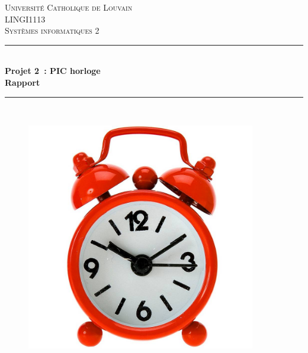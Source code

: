 \documentclass[12pt,a4paper]{article}
\begin{document}
	
\begin{titlepage}
\newcommand{\HRule}{\rule{\linewidth}{0.5mm}} %
\centering %
 
\null
\vspace{1cm}
\textsc{\Large Université Catholique de Louvain}\\[1cm] %
\textsc{\large LINGI1113 \\[0.3cm] Systèmes informatiques 2}\\[0.5cm] %


\HRule \\[0.4cm]
{ \LARGE \bfseries Projet 2~: PIC horloge\\[0.4cm] %
\large \bfseries Rapport} \\[0.4cm]

\HRule \\[0.5cm]
 
\begin{figure}[!h]
	\begin{center}
		\includegraphics[width=10cm]{image.jpg}
	\end{center}
\end{figure}


\end{titlepage}
\end{document}

